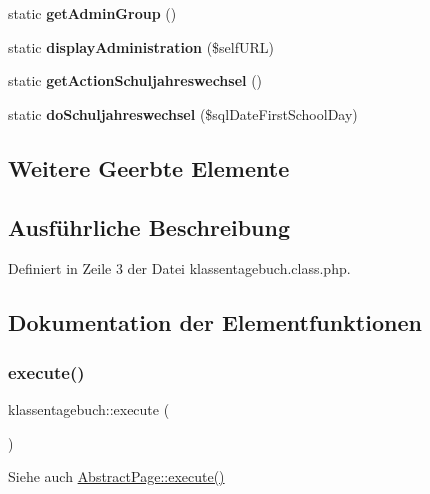 \begin{DoxyCompactItemize}
static {\bfseries get\+Admin\+Group} ()
\item 
\mbox{\label{classklassentagebuch_ac25fa6bde0e65d9ca624543e7ea20c9d}} 
static {\bfseries display\+Administration} (\$self\+U\+RL)
\item 
\mbox{\label{classklassentagebuch_a50245abfe1c55df62dc621b32ec32e55}} 
static {\bfseries get\+Action\+Schuljahreswechsel} ()
\item 
\mbox{\label{classklassentagebuch_a7078f63b1e4057f927050fb7741be675}} 
static {\bfseries do\+Schuljahreswechsel} (\$sql\+Date\+First\+School\+Day)
\end{DoxyCompactItemize}
\subsection*{Weitere Geerbte Elemente}


\subsection{Ausführliche Beschreibung}


Definiert in Zeile 3 der Datei klassentagebuch.\+class.\+php.



\subsection{Dokumentation der Elementfunktionen}
\mbox{\label{classklassentagebuch_aa4700b2a423608c1856d30dce8725964}} 
\subsubsection{\texorpdfstring{execute()}{execute()}}
{\footnotesize\ttfamily klassentagebuch\+::execute (\begin{DoxyParamCaption}{ }\end{DoxyParamCaption})}

\begin{DoxySeeAlso}{Siehe auch}
\mbox{\hyperlink{class_abstract_page_af8acacdd4a33f97087ef25a8771ecd9c}{Abstract\+Page\+::execute()}} 
\end{DoxySeeAlso}



